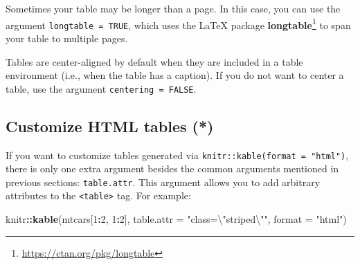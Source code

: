 \documentclass[
  11pt,
]{krantz}
\newenvironment{Shaded}{\begin{snugshade}}{\end{snugshade}}
\newcommand{\CharTok}[1]{\textcolor[rgb]{0.5,0.5,0.5}{#1}}
\newcommand{\DataTypeTok}[1]{\textcolor[rgb]{0.27,0.27,0.27}{#1}}
\newcommand{\DecValTok}[1]{\textcolor[rgb]{0.06,0.06,0.06}{#1}}
\newcommand{\KeywordTok}[1]{\textcolor[rgb]{0.27,0.27,0.27}{\textbf{#1}}}
\newcommand{\NormalTok}[1]{#1}
\newcommand{\OperatorTok}[1]{\textcolor[rgb]{0.43,0.43,0.43}{\textbf{#1}}}
\newcommand{\StringTok}[1]{\textcolor[rgb]{0.5,0.5,0.5}{#1}}
\renewcommand{\href}[2]{#2\footnote{\url{#1}}}
\begin{document}
Sometimes your table may be longer than a page. In this case, you can use the argument \texttt{longtable\ =\ TRUE}, which uses the LaTeX package \href{https://ctan.org/pkg/longtable}{\textbf{longtable}} to span your table to multiple pages.

Tables are center-aligned by default when they are included in a table environment (i.e., when the table has a caption). If you do not want to center a table, use the argument \texttt{centering\ =\ FALSE}.

\hypertarget{customize-html-tables}{%
\subsection{Customize HTML tables (*)}\label{customize-html-tables}}

If you want to customize tables generated via \texttt{knitr::kable(format\ =\ "html")}, there is only one extra argument besides the common arguments mentioned in previous sections: \texttt{table.attr}. This argument allows you to add arbitrary attributes to the \texttt{\textless{}table\textgreater{}} tag. For example:

\begin{Shaded}
\begin{Highlighting}[]
\NormalTok{knitr}\OperatorTok{::}\KeywordTok{kable}\NormalTok{(mtcars[}\DecValTok{1}\OperatorTok{:}\DecValTok{2}\NormalTok{, }\DecValTok{1}\OperatorTok{:}\DecValTok{2}\NormalTok{], }\DataTypeTok{table.attr =} \StringTok{"class=}\CharTok{\textbackslash{}"}\StringTok{striped}\CharTok{\textbackslash{}"}\StringTok{"}\NormalTok{, }\DataTypeTok{format =} \StringTok{"html"}\NormalTok{)}
\end{Highlighting}
\end{Shaded}
\end{document}
